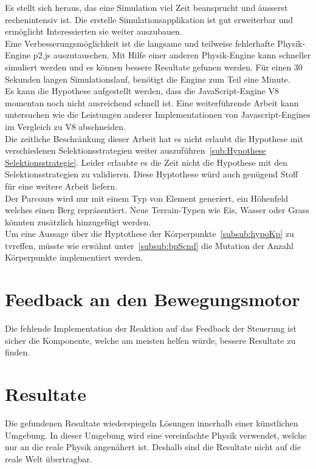     Es stellt sich heraus, das eine Simulation viel Zeit beansprucht und äusserst rechenintensiv ist.
    Die erstelle Simulationsapplikation ist gut erweiterbar und ermöglicht Interessierten sie weiter auszubauen.
    \\
    Eine Verbesserungsmöglichkeit ist die langsame und teilweise fehlerhafte Physik-Engine p2.js auszutauschen.
    Mit Hilfe einer anderen Physik-Engine kann schneller simuliert werden und es können bessere Resultate gefunen werden.
    Für einen 30 Sekunden langen Simulationslauf, benötigt die Engine zum Teil eine Minute.
    \\
    Es kann die Hypothese aufgestellt werden, dass die JavaScript-Engine V8 momentan noch nicht ausreichend schnell ist.
    Eine weiterführende Arbeit kann untersuchen wie die Leistungen anderer Implementationen von Javascript-Engines im
    Vergleich zu V8 abschneiden.
    \\
    Die zeitliche Beschränkung dieser Arbeit hat es nicht erlaubt
    die Hypothese mit verschiedenen Selektionsstrategien weiter auszuführen~\vref{sub:Hypothese Selektionsstrategie}.
    Leider erlaubte es die Zeit nicht die Hypothese mit den Selektionsstrategien zu validieren.
    Diese Hyptothese würd auch genügend Stoff für eine weitere Arbeit liefern.
    \\
    Der Parcours wird nur mit einem Typ von Element generiert, ein Höhenfeld welches einen Berg repräsentiert.
    Neue Terrain-Typen wie Eis, Wasser oder Grass könnten zusätzlich hinzugefügt werden.
    \\
    Um eine Aussage über die Hyptothese der Körperpunkte~\vref{subsub:hypoKp} zu tvreffen,
    müsste wie erwähnt unter~\vref{subsub:bpScnd} die Mutation der Anzahl Körperpunkte implementiert werden.

  \section{Feedback an den Bewegungsmotor}

    Die fehlende Implementation der Reaktion auf das Feedback der Steuerung ist sicher die Komponente,
    welche am meisten helfen würde, bessere Resultate zu finden.

  \section{Resultate}

    Die gefundenen Resultate wiederspiegeln Lösungen innerhalb einer künstlichen Umgebung.
    In dieser Umgebung wird eine vereinfachte Physik verwendet, welche nur an die reale Physik angenähert ist.
    Deshalb sind die Resultate nicht auf die reale Welt übertragbar.

